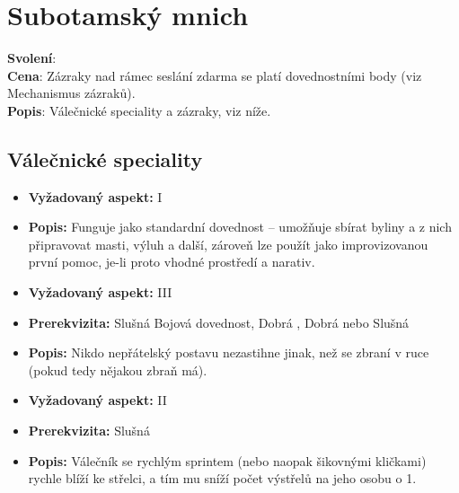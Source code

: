 \documentclass[../main.tex]{subfiles}
\begin{document}
\section{Subotamský mnich}
\label{sec:subatom}

\begin{povolani}
\textbf{Svolení}:\\
\textbf{Cena}: Zázraky nad rámec seslání zdarma se platí dovednostními body (viz Mechanismus zázraků).\\
\textbf{Popis}: Válečnické speciality a zázraky, viz níže.
\end{povolani}

\subsection{Válečnické speciality}
\label{sec:val-spec-sub}

\begin{specialita}[Bylinkářství]
\begin{itemize}
	\item \textbf{Vyžadovaný aspekt:} I
	\item \textbf{Popis:} Funguje jako standardní dovednost  – umožňuje sbírat byliny a z nich připravovat masti, výluh a další, zároveň lze použít jako improvizovanou první pomoc, je-li proto vhodné prostředí a narativ.
\end{itemize}
\end{specialita}

\begin{specialita}
\begin{itemize}
	\item \textbf{Vyžadovaný aspekt:} III
	\item \textbf{Prerekvizita:} Slušná Bojová dovednost, Dobrá , Dobrá  nebo Slušná 
	\item \textbf{Popis:} Nikdo nepřátelský postavu nezastihne jinak, než se zbraní v ruce (pokud tedy nějakou zbraň má).
\end{itemize}
\end{specialita}

\begin{specialita}[Zteč]
\begin{itemize}
	\item \textbf{Vyžadovaný aspekt:} II
	\item \textbf{Prerekvizita:} Slušná 
	\item \textbf{Popis:} Válečník se rychlým sprintem (nebo naopak šikovnými kličkami) rychle blíží ke střelci, a tím mu sníží počet výstřelů na jeho osobu o 1.
\end{itemize}
\end{specialita}
\end{document}
